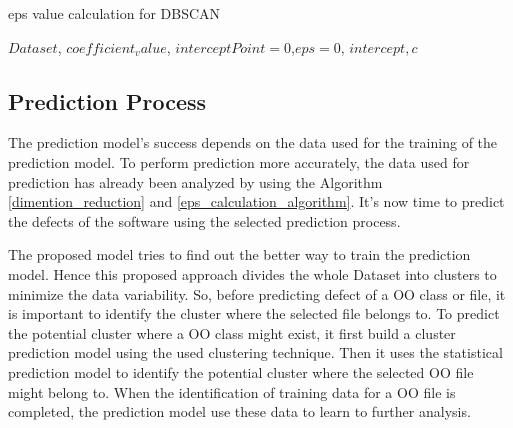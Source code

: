 \documentclass[12pt]{report}
\begin{document}
\begin{algorithm}
	\caption{eps value calculation for DBSCAN}
	\label{eps_calculation_algorithm}
		\begin{algorithmic}[1]
			\REQUIRE  $ Dataset$, $coefficient_value$, $interceptPoint=0$,$eps=0$, $intercept, c$
				
				\ENDFOR
		\end{algorithmic}
	\end{algorithm}
	
	
	
\subsection{Prediction Process}
The prediction model's success depends on the data used for the training of the prediction model. To perform prediction more accurately, the data used for prediction has already been analyzed by using the Algorithm \ref{dimention_reduction} and \ref{eps_calculation_algorithm}. It's now time to predict the defects of the software using the selected prediction process.

%
%

The proposed model tries to find out the better way to train the prediction model. Hence this proposed approach divides the whole Dataset into clusters to minimize the data variability. So, before predicting defect of a OO class or file, it is important to identify the cluster where the selected file belongs to. To predict the potential cluster where a OO class might exist, it first build a cluster prediction model using the used clustering technique. Then it uses the statistical prediction model to identify the potential cluster where the selected OO file might belong to. When the identification of training data for a OO file is completed, the prediction model use these data to learn to further analysis.
%
\end{document}
